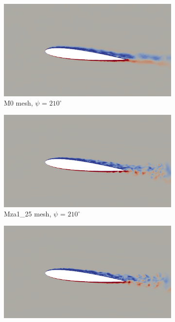 \begin{figure}[H]
	\centering
	\begin{center}
		\begin{subfigure}[b]{0.475\textwidth}
			\centering
			\includegraphics[width=1\textwidth]{figures/zonal_adapt_results/vorticity_plots_Re200k/M0/phase_210.png}
			\caption{M0 mesh, $\psi$ = $210^\circ$}
			\label{fig:M0_Re200k_sp_psi210}
		\end{subfigure}
	\end{center}
	\begin{subfigure}[b]{0.475\textwidth}
		\centering
		\includegraphics[width=1\textwidth]{figures/zonal_adapt_results/vorticity_plots_Re200k/Mza1_50/phase_210.png}
		\caption{Mza1\_25 mesh, $\psi$ = $210^\circ$}
		\label{fig:Mza1_50_Re200k_sp_psi210}
	\end{subfigure}
	\begin{subfigure}[b]{0.475\textwidth}
		\centering
		\includegraphics[width=1\textwidth]{figures/zonal_adapt_results/vorticity_plots_Re200k/Mza1_100/phase_210.png}

\end{subfigure}
\end{figure}
